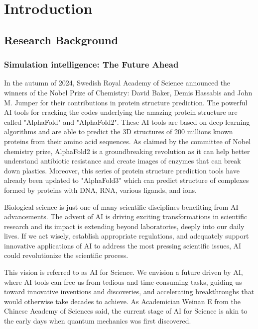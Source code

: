 \chapter{Introduction}

\section{Research Background}

\subsection{Simulation intelligence: The Future Ahead}
In the autumn of 2024, Swedish Royal Academy of Science announced the winners of the Nobel Prize of Chemistry: David Baker, Demis Hassabis and John M. Jumper for their contributions in protein structure prediction. The powerful AI tools for cracking the codes underlying the amazing protein structure are called "AlphaFold" and "AlphaFold2". These AI tools are based on deep learning algorithms and are able to predict the 3D structures of 200 millions known proteins from their amino acid sequences. As claimed by the committee of Nobel chemistry prize, AlphaFold2 is a groundbreaking revolution as it can help better understand antibiotic resistance and create images of enzymes that can break down plastics. Moreover, this series of protein structure prediction tools have already been updated to "AlphaFold3" which can predict structure of complexes formed by proteins with DNA, RNA, various ligands, and ions.

Biological science is just one of many scientific disciplines benefiting from AI advancements. The advent of AI is driving exciting transformations in scientific research and its impact is extending beyond laboratories, deeply into our daily lives. If we act wisely, establish appropriate regulations, and adequately support innovative applications of AI to address the most pressing scientific issues, AI could revolutionize the scientific process.

This vision is referred to as AI for Science. We envision a future driven by AI, where AI tools can free us from tedious and time-consuming tasks, guiding us toward innovative inventions and discoveries, and accelerating breakthroughs that would otherwise take decades to achieve. As Academician Weinan E from the Chinese Academy of Sciences said, the current stage of AI for Science is akin to the early days when quantum mechanics was first discovered.

